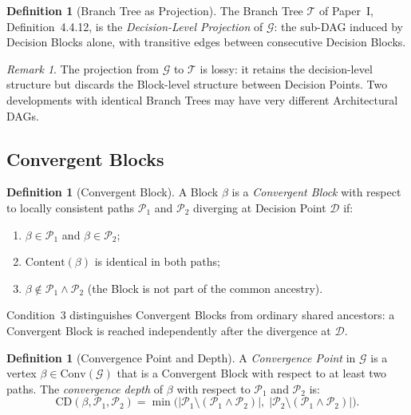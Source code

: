\documentclass[12pt, a4paper]{article}
\theoremstyle{plain}
\theoremstyle{definition}
\newtheorem{definition}[theorem]{Definition}
\theoremstyle{remark}
\newtheorem{remark}[theorem]{Remark}
\newcommand{\Conv}[1]{\mathrm{Conv}(#1)}
\newcommand{\CD}[3]{\mathrm{CD}(#1,#2,#3)}
\begin{document}
\begin{definition}[Branch Tree as Projection]
\label{def:projection}
The Branch Tree $\mathcal{T}$ of Paper~I, Definition~4.4.12, is the
\emph{Decision-Level Projection} of $\mathcal{G}$: the sub-DAG
induced by Decision Blocks alone, with transitive edges between
consecutive Decision Blocks.
\end{definition}

\begin{remark}
The projection from $\mathcal{G}$ to $\mathcal{T}$ is lossy: it
retains the decision-level structure but discards the Block-level
structure between Decision Points. Two developments with identical
Branch Trees may have very different Architectural DAGs.
\end{remark}

\subsection{Convergent Blocks}
\label{subsec:convergent}

\begin{definition}[Convergent Block]
\label{def:convergent}
A Block $\beta$ is a \emph{Convergent Block} with respect to locally
consistent paths $\mathcal{P}_1$ and $\mathcal{P}_2$ diverging at
Decision Point $\mathcal{D}$ if:
\begin{enumerate}
  \item $\beta \in \mathcal{P}_1$ and $\beta \in \mathcal{P}_2$;
  \item $\mathrm{Content}(\beta)$ is identical in both paths;
  \item $\beta \notin \mathcal{P}_1 \wedge \mathcal{P}_2$ (the Block
        is not part of the common ancestry).
\end{enumerate}
Condition~3 distinguishes Convergent Blocks from ordinary shared
ancestors: a Convergent Block is reached independently after the
divergence at $\mathcal{D}$.
\end{definition}

\begin{definition}[Convergence Point and Depth]
\label{def:conv-point}
A \emph{Convergence Point} in $\mathcal{G}$ is a vertex
$\beta \in \Conv{\mathcal{G}}$ that is a Convergent Block with
respect to at least two paths. The \emph{convergence depth} of
$\beta$ with respect to $\mathcal{P}_1$ and $\mathcal{P}_2$ is:
\[
  \CD{\beta}{\mathcal{P}_1}{\mathcal{P}_2}
  = \min\!\bigl(
      |\mathcal{P}_1 \setminus (\mathcal{P}_1 \wedge \mathcal{P}_2)|,\;
      |\mathcal{P}_2 \setminus (\mathcal{P}_1 \wedge \mathcal{P}_2)|
    \bigr).
\]
\end{definition}
\end{document}
